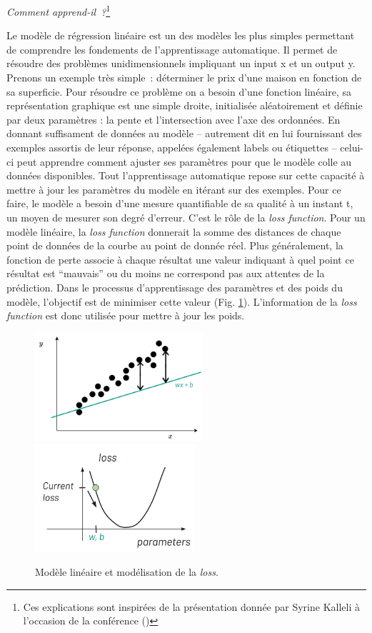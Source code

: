 \emph{Comment apprend-il~?}\footnote{Ces explications sont inspirées de
  la présentation donnée par Syrine Kalleli à l'occasion de la
  conférence  (\cite{noauthor_eida_nodate})}

Le modèle de régression linéaire est un des modèles les plus simples
permettant de comprendre les fondements de l'apprentissage automatique.
Il permet de résoudre des problèmes unidimensionnels impliquant un input
x et un output y. Prenons un exemple très simple~: déterminer le prix
d'une maison en fonction de sa superficie. Pour résoudre ce problème on
a besoin d'une fonction linéaire, sa représentation graphique est une
simple droite, initialisée aléatoirement et définie par deux paramètres
: la pente et l'intersection avec l'axe des ordonnées. En donnant
suffisament de données au modèle -- autrement dit en lui fournissant des
exemples assortis de leur réponse, appelées également labels ou
étiquettes -- celui-ci peut apprendre comment ajuster ses paramètres
pour que le modèle colle au données disponibles. Tout l'apprentissage
automatique repose sur cette capacité à mettre à jour les paramètres du
modèle en itérant sur des exemples. Pour ce faire, le modèle a besoin d'une
mesure quantifiable de sa qualité à un instant t, un moyen de mesurer
son degré d'erreur. C'est le rôle de la \emph{loss function}. Pour un modèle linéaire, la \emph{loss function} donnerait la somme des
distances de chaque point de données de la courbe au point de donnée
réel. Plus généralement, la fonction de perte associe à chaque résultat
une valeur indiquant à quel point ce résultat est ``mauvais'' ou du
moins ne correspond pas aux attentes de la prédiction. Dans le processus
d'apprentissage des paramètres et des poids du modèle, l'objectif est de
minimiser cette valeur (Fig. \ref{fig:loss}). L'information de la \emph{loss function} est
donc utilisée pour mettre à jour les poids.

          \begin{figure}[H]
          \begin{center}
          \includegraphics[height=4cm]{figues/modele_lineaire_loss.png}
          \includegraphics[height=4cm]{figues/loss.png}
          \end{center}
          \caption{Modèle linéaire et modélisation de la \emph{loss}.}
          \label{fig:loss} \end{figure}

